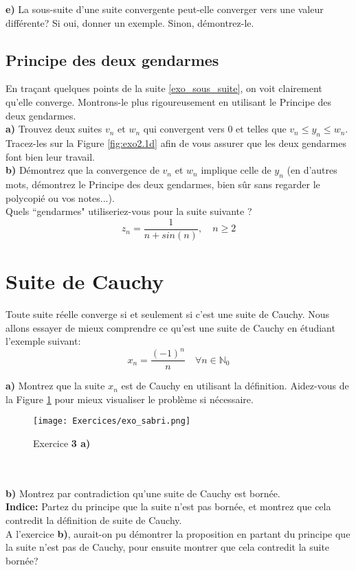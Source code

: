 \documentclass[a4paper, 12pt, french, twoside]{article}
\newcommand{\Nn}{{\mathbb{N}}}
\begin{document}
\textbf{e)} La sous-suite d'une suite convergente peut-elle converger vers une valeur différente? Si oui, donner un exemple. Sinon, démontrez-le.

\subsection{Principe des deux gendarmes}
En traçant quelques points de la suite \eqref{exo_sous_suite}, on voit clairement qu'elle converge. Montrons-le plus rigoureusement en utilisant le Principe des deux gendarmes.\\

\textbf{a)} Trouvez deux suites $v_n$ et $w_n$ qui convergent vers $0$ et telles que $v_n \leq y_n \leq w_n$. Tracez-les sur la Figure \ref{fig:exo2.1d} afin de vous assurer que les deux gendarmes font bien leur travail. \\

\textbf{b)} Démontrez que la convergence de $v_n$ et $w_n$ implique celle de $y_n$ (en d'autres mots, démontrez le Principe des deux gendarmes, bien sûr sans regarder le polycopié ou vos notes...). \\

\faLightbulbO \quad {} Quels ``gendarmes" utiliseriez-vous pour la suite suivante ?
\begin{equation}
    z_n = \frac{1}{n+sin(n)}, \quad n \geq 2
\end{equation}

\section{Suite de Cauchy}
Toute suite réelle converge si et seulement si c'est une suite de Cauchy. Nous allons essayer de mieux comprendre ce qu'est une suite de Cauchy en étudiant l'exemple suivant:
\begin{equation}
    x_n = \frac{(-1)^n}{n} \quad \forall n\in \Nn_0
\end{equation}

\textbf{a)} Montrez que la suite $x_n$ est de Cauchy en utilisant la définition. Aidez-vous de la Figure \ref{fig:exo3a} pour mieux visualiser le problème si nécessaire.\\

\begin{figure}[H]
    \centering
    \texttt{[image: Exercices/exo\_sabri.png]}
    \caption{Exercice \textbf{3 a)}}
    \label{fig:exo3a}
\end{figure}\\ \\

\textbf{b)} Montrez par contradiction qu'une suite de Cauchy est bornée. \\
\textbf{Indice:} Partez du principe que la suite n'est pas bornée, et montrez que cela contredit la définition de suite de Cauchy. \\

\faLightbulbO \quad {} A l'exercice \textbf{b)}, aurait-on pu démontrer la proposition en partant du principe que la suite n'est pas de Cauchy, pour ensuite montrer que cela contredit la suite bornée?
\end{document}
